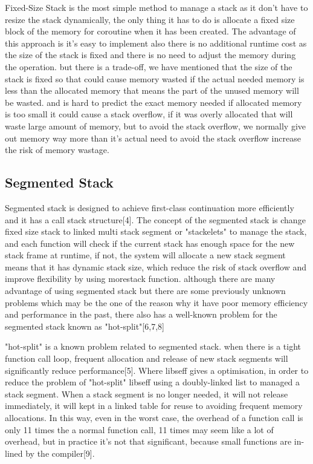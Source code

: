 \documentclass[logo,bsc,singlespacing,parskip]{infthesis}
\begin{document}
Fixed-Size Stack is the most simple method to manage a stack as it don't have to resize the stack dynamically, the only thing it has to do is allocate a fixed size block of the memory for coroutine when it has been created. The advantage of this approach is it's easy to implement also there is no additional runtime cost as the size of the stack is fixed and there is no need to adjust the memory during the operation. but there is a trade-off, we have mentioned that the size of the stack is fixed so that could cause memory wasted if the actual needed memory is less than the allocated memory that means the part of the unused memory will be wasted. and is hard to predict the exact memory needed if allocated memory is too small it could cause a stack overflow, if it was overly allocated that will waste large amount of memory, but to avoid the stack overflow, we normally give out memory way more than it's actual need to avoid the stack overflow increase the risk of memory wastage.



\medskip

\subsection{Segmented Stack}

Segmented stack is designed to achieve first-class continuation more efficiently and it has a call stack structure[4]. The concept of the segmented stack is change fixed size stack to linked multi stack segment or "stackelets" to manage the stack, and each function will check if the current stack has enough space for the new stack frame at runtime, if not, the system will allocate a new stack segment means that it has dynamic stack size, which reduce the risk of stack overflow and improve flexibility by using morestack function. although there are many advantage of using segmented stack but there are some previously unknown problems which may be the one of the reason why it have poor memory efficiency and performance in the past, there also has a well-known problem for the segmented stack known as "hot-split"[6,7,8]

\medskip

"hot-split" is a known problem related to segmented stack. when there is a tight function call loop, frequent allocation and release of new stack segments will significantly reduce performance[5]. Where libseff gives a optimisation, in order to reduce the problem of "hot-split" libseff using a doubly-linked list to managed a stack segment. When a stack segment is no longer needed, it will not release immediately, it will kept in a linked table for reuse to avoiding frequent memory allocations. In this way, even in the worst case, the overhead of a function call is only 11 times the a normal function call, 11 times may seem like a lot of overhead, but in practice it's not that significant, because small functions are in-lined by the compiler[9].
\end{document}
